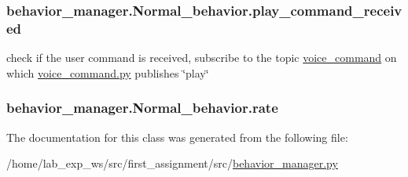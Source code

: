 \subsubsection[{\texorpdfstring{play\+\_\+command\+\_\+received}{play_command_received}}]{\setlength{\rightskip}{0pt plus 5cm}behavior\+\_\+manager.\+Normal\+\_\+behavior.\+play\+\_\+command\+\_\+received}\hypertarget{classbehavior__manager_1_1Normal__behavior_a023e0b91a5c02b8bce8cc771bba4ecfc}{}\label{classbehavior__manager_1_1Normal__behavior_a023e0b91a5c02b8bce8cc771bba4ecfc}


check if the user command is received, subscribe to the topic \hyperlink{namespacevoice__command}{voice\+\_\+command} on which \hyperlink{voice__command_8py}{voice\+\_\+command.\+py} publishes \char`\"{}play\char`\"{} 

\subsubsection[{\texorpdfstring{rate}{rate}}]{\setlength{\rightskip}{0pt plus 5cm}behavior\+\_\+manager.\+Normal\+\_\+behavior.\+rate}\hypertarget{classbehavior__manager_1_1Normal__behavior_a8c0881c34370caec4f5298f0ebe35489}{}\label{classbehavior__manager_1_1Normal__behavior_a8c0881c34370caec4f5298f0ebe35489}


The documentation for this class was generated from the following file\+:\begin{DoxyCompactItemize}
\item 
/home/lab\+\_\+exp\+\_\+ws/src/first\+\_\+assignment/src/\hyperlink{behavior__manager_8py}{behavior\+\_\+manager.\+py}\end{DoxyCompactItemize}
